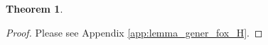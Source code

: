 \documentclass[12pt,onecolumn,draftcls]{IEEEtran}
\newcommand{\bs}{\boldsymbol}
\newtheorem{theorem}{Theorem}
\begin{document}
\begin{theorem}
\end{theorem}
\begin{proof}
Please see Appendix \ref{app:lemma_gener_fox_H}.
\end{proof}








\end{document}
